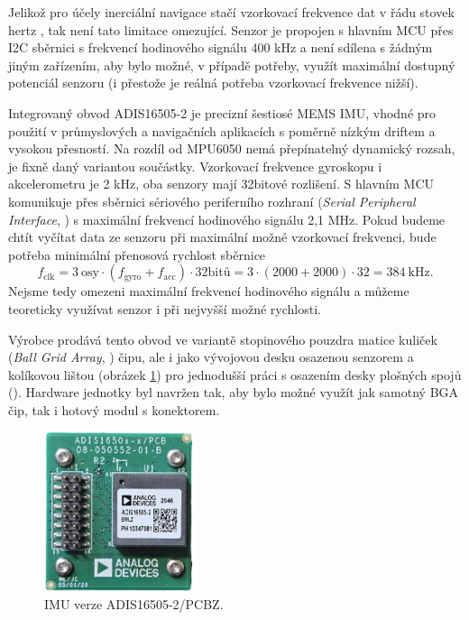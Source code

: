Jelikož pro účely inerciální navigace stačí vzorkovací frekvence dat v  řádu stovek hertz \cite{Wei2022}, tak není tato limitace omezující. Senzor je propojen s hlavním \ac{MCU} přes \ac{I2C} sběrnici s frekvencí hodinového signálu 400 kHz a není sdílena s žádným jiným zařízením, aby bylo možné, v případě potřeby, využít maximální dostupný potenciál senzoru (i přestože je reálná potřeba vzorkovací frekvence nižší).


Integrovaný obvod ADIS16505-2 je precizní šestiosé \ac{MEMS} \ac{IMU}, vhodné pro použití v průmyslových a navigačních aplikacích s poměrně nízkým driftem a vysokou přesností. Na rozdíl od MPU6050 nemá přepínatelný dynamický rozsah, je fixně daný variantou součástky. Vzorkovací frekvence gyroskopu i akcelerometru je 2 kHz, oba senzory mají 32bitové rozlišení. S hlavním \ac{MCU} komunikuje přes sběrnici sériového periferního rozhraní (\emph{Serial
Peripheral Interface}, ) s maximální frekvencí hodinového signálu 2,1 MHz. \cite{UZFqHmQU7ZzI3OLB} Pokud budeme chtít vyčítat data ze senzoru při maximální možné vzorkovací frekvenci, bude potřeba minimální přenosová rychlost sběrnice
\begin{equation}
f_{\mathrm{clk}}=3~\mathrm{osy} \cdot(f_{\mathrm{gyro}} + f_{\mathrm{acc}})\cdot \mathrm{32bitů}=3\cdot(2000+2000)\cdot 32=\SI{384}{\kilo\hertz} .
\end{equation}
Nejsme tedy omezeni maximální frekvencí hodinového signálu a můžeme teoreticky využívat senzor i při nejvyšší možné rychlosti.

Výrobce prodává tento obvod ve variantě stopinového pouzdra matice kuliček (\emph{Ball Grid Array}, ) čipu, ale i jako vývojovou desku osazenou senzorem a kolíkovou lištou (obrázek \ref{fig:ADIS16505PCB}) pro jednodušší práci s osazením desky plošných spojů (). \cite{UZFqHmQU7ZzI3OLB} Hardware jednotky byl navržen tak, aby bylo možné využít jak samotný \ac{BGA} čip, tak i hotový modul s konektorem.

\begin{figure}[h]
    \centering
    \includegraphics[width=0.4\textwidth]{obrazky/ADIS16505PCB}
    \caption{IMU verze ADIS16505-2/PCBZ.}
    \label{fig:ADIS16505PCB}
\end{figure}

